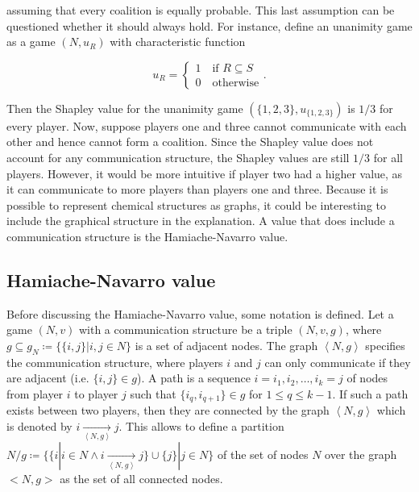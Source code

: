 assuming that every coalition is equally probable. This last assumption can be questioned whether it should
always hold. For instance, define an unanimity game as a game $(N, u_R)$ with characteristic function


\begin{equation}
	u_R = \begin{cases}
		1 \quad \text{if } R \subseteq S \\
		0 \quad \text{otherwise}
	\end{cases}.
\end{equation}


Then the Shapley value for the unanimity game $(\{1, 2, 3\}, u_{\{1,2,3\}})$ is $1/3$ for every player.\cite{hamiache_value_1999}
Now, suppose players one and three cannot communicate with each other and hence cannot form a coalition.
Since the Shapley value does not account for any communication structure, the Shapley values are still
$1/3$ for all players. However, it would be more intuitive if player two had a higher value, as it can
communicate to more players than players one and three. Because it is possible to represent chemical
structures as graphs, it could be interesting to include the graphical structure in the explanation. A
value that does include a communication structure is the Hamiache-Navarro value.\cite{hamiache_value_1999, hamiache_associated_2020}


\subsection{Hamiache-Navarro value}


Before discussing the Hamiache-Navarro value, some notation is defined. Let a game $(N, v)$ with a
communication structure be a triple $(N, v, g)$, where $g \subseteq g_N \coloneqq \{ \{i, j \} | i, j \in N \}$
is a set of adjacent nodes. The graph $\left< N, g \right>$ specifies the
communication structure, where players $i$ and $j$ can only communicate if they are adjacent
(i.e. $\{i, j \} \in g$). A path is a sequence $i = i_1, i_2, \dots , i_k = j$ of nodes from player
$i$ to player $j$ such that $\{i_q, i_{q+1} \} \in g$ for $1 \le q \le k - 1$. If such a path exists
between two players, then they are connected by the graph $\left<N, g\right>$ which is denoted by
$i \underset{\left< N, g \right>}{\rightarrow} j$. This allows to define a partition
$N/g \coloneqq \{\{ i | i \in N \land i \underset{\left<N, g \right>}{\rightarrow} j\} \cup \{j\} | j \in N \}$
of the set of nodes $N$ over the graph $<N, g>$ as the set of all connected nodes.\cite{hamiache_value_1999}

